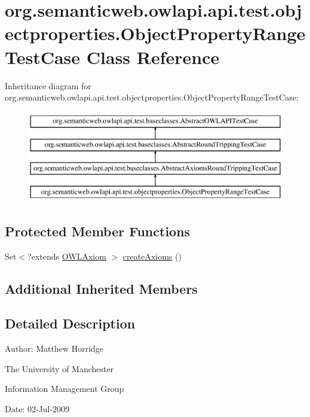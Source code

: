 \hypertarget{classorg_1_1semanticweb_1_1owlapi_1_1api_1_1test_1_1objectproperties_1_1_object_property_range_test_case}{\section{org.\-semanticweb.\-owlapi.\-api.\-test.\-objectproperties.\-Object\-Property\-Range\-Test\-Case Class Reference}
\label{classorg_1_1semanticweb_1_1owlapi_1_1api_1_1test_1_1objectproperties_1_1_object_property_range_test_case}
}
Inheritance diagram for org.\-semanticweb.\-owlapi.\-api.\-test.\-objectproperties.\-Object\-Property\-Range\-Test\-Case\-:\begin{figure}[H]
\begin{center}
\leavevmode
\includegraphics[height=4.000000cm]{classorg_1_1semanticweb_1_1owlapi_1_1api_1_1test_1_1objectproperties_1_1_object_property_range_test_case}
\end{center}
\end{figure}
\subsection*{Protected Member Functions}
\begin{DoxyCompactItemize}
\item 
Set$<$?extends \hyperlink{interfaceorg_1_1semanticweb_1_1owlapi_1_1model_1_1_o_w_l_axiom}{O\-W\-L\-Axiom} $>$ \hyperlink{classorg_1_1semanticweb_1_1owlapi_1_1api_1_1test_1_1objectproperties_1_1_object_property_range_test_case_a3db103f2e9fa7c53427da1f8102036dd}{create\-Axioms} ()
\end{DoxyCompactItemize}
\subsection*{Additional Inherited Members}


\subsection{Detailed Description}
Author\-: Matthew Horridge\par
 The University of Manchester\par
 Information Management Group\par
 Date\-: 02-\/\-Jul-\/2009 


